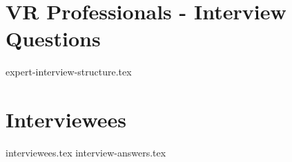 
\appendix
\chapter{VR Professionals - Interview Questions}
\label{appendix:ex-interview-structure}
{expert-interview-structure.tex}

\chapter{Interviewees}
\label{appendix:interviewees}
{interviewees.tex}
{interview-answers.tex}
